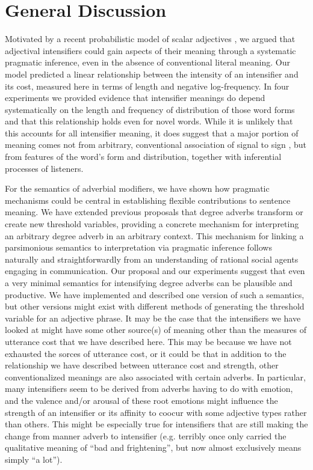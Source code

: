 \documentclass[10pt,letterpaper]{article}
\begin{document}
\section{General Discussion}

Motivated by a recent probabilistic model of scalar adjectives \cite{lassiter}, we argued that adjectival intensifiers could gain aspects of their meaning through a systematic pragmatic inference, even in the absence of conventional literal meaning. Our model predicted a linear relationship between the intensity of an intensifier and its cost, measured here in terms of length and negative log-frequency.
In four experiments we provided evidence that intensifier meanings do depend systematically on the length and frequency of distribution of those word forms and that this relationship holds even for novel words.
While it is unlikely that this accounts for all intensifier meaning, it does suggest that a major portion of meaning comes not from arbitrary, conventional association of signal to sign \cite{saussure}, but from features of the word's form and distribution, together with inferential processes of listeners.


For the semantics of adverbial modifiers, we have shown how pragmatic mechanisms could be central in establishing flexible contributions to sentence meaning.
We have extended previous proposals that degree adverbs transform or create new threshold variables, providing a concrete mechanism for interpreting an arbitrary degree adverb in an arbitrary context.
This mechanism for linking a parsimonious semantics to interpretation via pragmatic inference follows naturally and straightforwardly from an understanding of rational social agents engaging in communication.
Our proposal and our experiments suggest that even a very minimal semantics for intensifying degree adverbs can be plausible and productive.
We have implemented and described one version of such a semantics, but other versions might exist with different methods of generating the threshold variable for an adjective phrase.
It may be the case that the intensifiers we have looked at might have some other source(s) of meaning other than the measures of utterance cost that we have described here. This may be because we have not exhausted the sorces of utterance cost, or it could be that in addition to the relationship we have described between utterance cost and strength, other conventionalized meanings are also associated with certain adverbs. In particular, many intensifiers seem to be derived from adverbs having to do with emotion, and the valence and/or arousal of these root emotions might influence the strength of an intensifier or its affinity to coocur with some adjective types rather than others. This might be especially true for intensifiers that are still making the change from manner adverb to intensifier (e.g. terribly once only carried the qualitative meaning of ``bad and frightening'', but now almost exclusively means simply ``a lot'').
\end{document}
